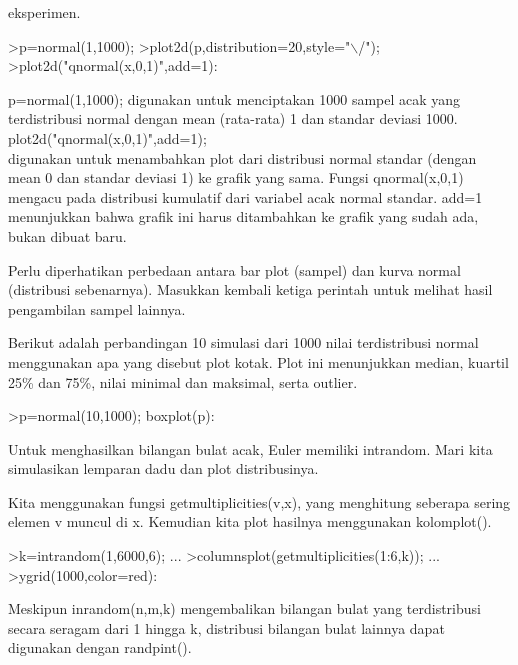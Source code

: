 \documentclass[a4paper,10pt]{article}
\begin{document}
\begin{eulernotebook}
\begin{eulercomment}
\begin{eulercomment}
\begin{eulercomment}
eksperimen.
\end{eulercomment}
\begin{eulerprompt}
>p=normal(1,1000); 
>plot2d(p,distribution=20,style="\(\backslash\)/"); 
>plot2d("qnormal(x,0,1)",add=1): 
\end{eulerprompt}
\begin{eulercomment}
p=normal(1,1000); digunakan untuk menciptakan 1000 sampel acak yang
terdistribusi normal dengan mean (rata-rata) 1 dan standar deviasi
1000.\\
plot2d("qnormal(x,0,1)",add=1); \\
digunakan untuk menambahkan plot dari distribusi normal standar
(dengan mean 0 dan standar deviasi 1) ke grafik yang sama. Fungsi
qnormal(x,0,1) mengacu pada distribusi kumulatif dari variabel acak
normal standar. add=1 menunjukkan bahwa grafik ini harus ditambahkan
ke grafik yang sudah ada, bukan dibuat baru.

Perlu diperhatikan perbedaan antara bar plot (sampel) dan kurva normal
(distribusi sebenarnya). Masukkan kembali ketiga perintah untuk
melihat hasil pengambilan sampel lainnya.
\end{eulercomment}
\begin{eulercomment}
Berikut adalah perbandingan 10 simulasi dari 1000 nilai terdistribusi
normal menggunakan apa yang disebut plot kotak. Plot ini menunjukkan
median, kuartil 25\% dan 75\%, nilai minimal dan maksimal, serta
outlier.
\end{eulercomment}
\begin{eulerprompt}
>p=normal(10,1000); boxplot(p):
\end{eulerprompt}
\begin{eulercomment}
Untuk menghasilkan bilangan bulat acak, Euler memiliki intrandom. Mari
kita simulasikan lemparan dadu dan plot distribusinya.

Kita menggunakan fungsi getmultiplicities(v,x), yang menghitung
seberapa sering elemen v muncul di x. Kemudian kita plot hasilnya
menggunakan kolomplot().
\end{eulercomment}
\begin{eulerprompt}
>k=intrandom(1,6000,6);  ...
>columnsplot(getmultiplicities(1:6,k));  ...
>ygrid(1000,color=red):
\end{eulerprompt}
\begin{eulercomment}
Meskipun inrandom(n,m,k) mengembalikan bilangan bulat yang
terdistribusi secara seragam dari 1 hingga k, distribusi bilangan
bulat lainnya dapat digunakan dengan randpint().


\end{eulercomment}
\end{eulercomment}
\end{eulercomment}
\end{eulernotebook}
\end{document}
